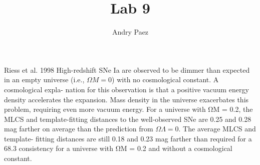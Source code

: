 \documentclass{article}
\begin{document}
\title{Lab 9}
\author{Andry Paez}
\date{}
\maketitle

\begin{section*}{Riess et al. 1998}   
    High-redshift SNe Ia are observed to be dimmer than expected in an empty
    universe (i.e., $\Omega M = 0$) with no cosmological constant. A cosmological expla-
    nation for this observation is that a positive vacuum energy density accelerates
    the expansion. Mass density in the universe exacerbates this problem, requiring
    even more vacuum energy. For a universe with ΩM = 0.2, the MLCS and
    template-ﬁtting distances to the well-observed SNe are 0.25 and 0.28 mag farther
    on average than the prediction from $\Omega\Lambda = 0$. The average MLCS and template-
    ﬁtting distances are still 0.18 and 0.23 mag farther than required for a 68.3%
    consistency for a universe with ΩM = 0.2 and without a cosmological constant.
    
\end{section*}
\end{document}
